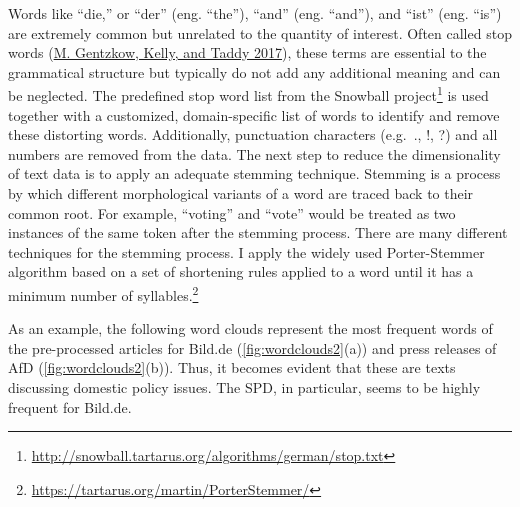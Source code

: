 \documentclass[
  12pt,
]{article}
\begin{document}
Words like ``die,'' or ``der'' (eng. ``the''), ``and'' (eng. ``and''),
and ``ist'' (eng. ``is'') are extremely common but unrelated to the
quantity of interest. Often called stop words
(\protect\hyperlink{ref-gentzkow_text_2017}{M. Gentzkow, Kelly, and
Taddy 2017}), these terms are essential to the grammatical structure but
typically do not add any additional meaning and can be neglected. The
predefined stop word list from the Snowball project\footnote{\url{http://snowball.tartarus.org/algorithms/german/stop.txt}}
is used together with a customized, domain-specific list of words to
identify and remove these distorting words. Additionally, punctuation
characters (e.g.~., !, ?) and all numbers are removed from the data. The
next step to reduce the dimensionality of text data is to apply an
adequate stemming technique. Stemming is a process by which different
morphological variants of a word are traced back to their common root.
For example, ``voting'' and ``vote'' would be treated as two instances
of the same token after the stemming process. There are many different
techniques for the stemming process. I apply the widely used
Porter-Stemmer algorithm based on a set of shortening rules applied to a
word until it has a minimum number of syllables.\footnote{\url{https://tartarus.org/martin/PorterStemmer/}}

As an example, the following word clouds represent the most frequent
words of the pre-processed articles for Bild.de
(\autoref{fig:wordclouds2}(a)) and press releases of AfD
(\autoref{fig:wordclouds2}(b)). Thus, it becomes evident that these are
texts discussing domestic policy issues. The SPD, in particular, seems
to be highly frequent for Bild.de.
\end{document}
